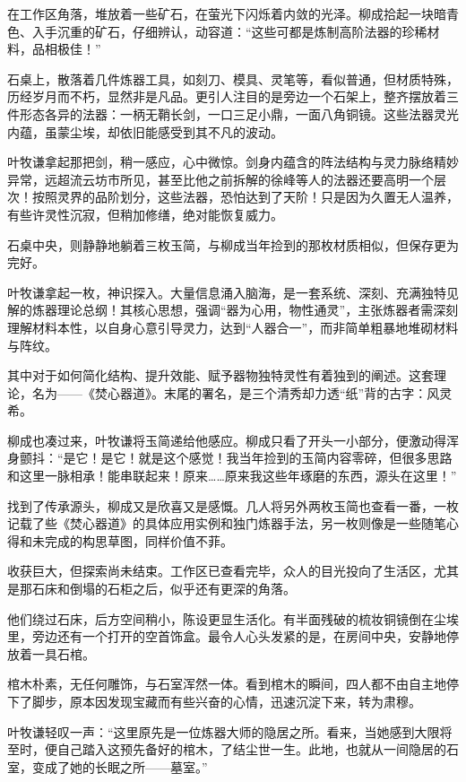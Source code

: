 在工作区角落，堆放着一些矿石，在萤光下闪烁着内敛的光泽。柳成拾起一块暗青色、入手沉重的矿石，仔细辨认，动容道：“这些可都是炼制高阶法器的珍稀材料，品相极佳！”

石桌上，散落着几件炼器工具，如刻刀、模具、灵笔等，看似普通，但材质特殊，历经岁月而不朽，显然非是凡品。更引人注目的是旁边一个石架上，整齐摆放着三件形态各异的法器：一柄无鞘长剑，一口三足小鼎，一面八角铜镜。这些法器灵光内蕴，虽蒙尘埃，却依旧能感受到其不凡的波动。

叶牧谦拿起那把剑，稍一感应，心中微惊。剑身内蕴含的阵法结构与灵力脉络精妙异常，远超流云坊市所见，甚至比他之前拆解的徐峰等人的法器还要高明一个层次！按照灵界的品阶划分，这些法器，恐怕达到了天阶！只是因为久置无人温养，有些许灵性沉寂，但稍加修缮，绝对能恢复威力。

石桌中央，则静静地躺着三枚玉简，与柳成当年捡到的那枚材质相似，但保存更为完好。

叶牧谦拿起一枚，神识探入。大量信息涌入脑海，是一套系统、深刻、充满独特见解的炼器理论总纲！其核心思想，强调“器为心用，物性通灵”，主张炼器者需深刻理解材料本性，以自身心意引导灵力，达到“人器合一”，而非简单粗暴地堆砌材料与阵纹。

其中对于如何简化结构、提升效能、赋予器物独特灵性有着独到的阐述。这套理论，名为——《焚心器道》。末尾的署名，是三个清秀却力透“纸”背的古字：风灵希。

柳成也凑过来，叶牧谦将玉简递给他感应。柳成只看了开头一小部分，便激动得浑身颤抖：“是它！是它！就是这个感觉！我当年捡到的玉简内容零碎，但很多思路和这里一脉相承！能串联起来！原来……原来我这些年琢磨的东西，源头在这里！”

找到了传承源头，柳成又是欣喜又是感慨。几人将另外两枚玉简也查看一番，一枚记载了些《焚心器道》的具体应用实例和独门炼器手法，另一枚则像是一些随笔心得和未完成的构思草图，同样价值不菲。

收获巨大，但探索尚未结束。工作区已查看完毕，众人的目光投向了生活区，尤其是那石床和倒塌的石柜之后，似乎还有更深的角落。

他们绕过石床，后方空间稍小，陈设更显生活化。有半面残破的梳妆铜镜倒在尘埃里，旁边还有一个打开的空首饰盒。最令人心头发紧的是，在房间中央，安静地停放着一具石棺。

棺木朴素，无任何雕饰，与石室浑然一体。看到棺木的瞬间，四人都不由自主地停下了脚步，原本因发现宝藏而有些兴奋的心情，迅速沉淀下来，转为肃穆。

叶牧谦轻叹一声：“这里原先是一位炼器大师的隐居之所。看来，当她感到大限将至时，便自己踏入这预先备好的棺木，了结尘世一生。此地，也就从一间隐居的石室，变成了她的长眠之所——墓室。”

